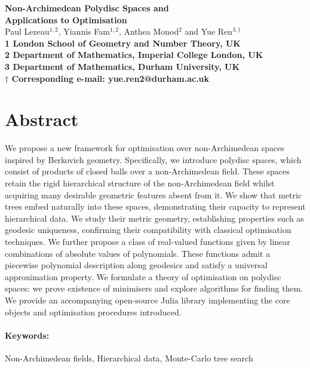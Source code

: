 \documentclass[10pt]{article}
\theoremstyle{definition}
\begin{document}
\def\spacingset#1{\renewcommand{\baselinestretch}%
{#1}\small\normalsize} \spacingset{1}


\begin{flushleft}
{\Large{\textbf{Non-Archimedean Polydisc Spaces and\\
Applications to Optimisation}}}
\newline
\\
Paul Lezeau$^{1,2}$, Yiannis Fam$^{1,2}$, Anthea Monod$^{2}$ and Yue Ren$^{3,\dagger}$
\\
\bigskip
\bf{1} London School of Geometry and Number Theory, UK
\\
\bf{2} Department of Mathematics, Imperial College London, UK
\\
\bf{3} Department of Mathematics, Durham University, UK
\\
\bigskip
$\dagger$ Corresponding e-mail: yue.ren2@durham.ac.uk
\end{flushleft}


\section*{Abstract}

We propose a new framework for optimisation over non-Archimedean spaces inspired by Berkovich geometry.  Specifically, we introduce polydisc spaces, which consist of products of closed balls over a non-Archimedean field. These spaces retain the rigid hierarchical structure of the non-Archimedean field whilst acquiring many desirable geometric features absent from it.  
We show that metric trees embed naturally into these spaces, demonstrating their capacity to represent hierarchical data.
We study their metric geometry, establishing properties such as geodesic uniqueness, confirming their compatibility with classical optimisation techniques. We further propose a class of real-valued functions given by linear combinations of absolute values of polynomials. These functions admit a piecewise polynomial description along geodesics and satisfy a universal approximation property. We formulate a theory of optimisation on polydisc spaces: we prove existence of minimisers and explore algorithms for finding them.  We provide an accompanying open-source Julia library implementing the core objects and optimisation procedures introduced.

\paragraph{Keywords:} Non-Archimedean fields, Hierarchical data, Monte-Carlo tree search
\end{document}
